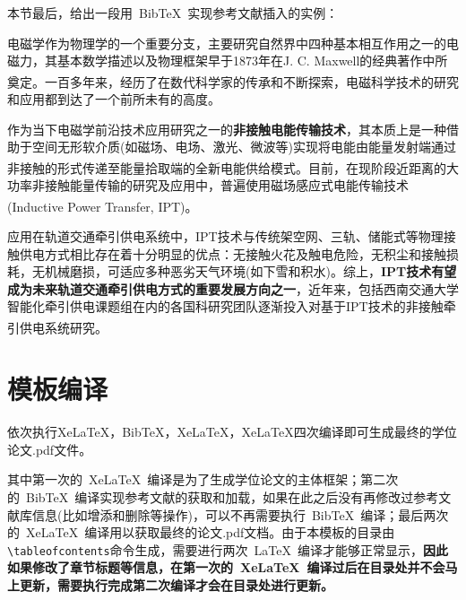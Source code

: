 \par
本节最后，给出一段用~BibTeX{}~实现参考文献插入的实例：

\begin{framed}
	电磁学作为物理学的一个重要分支，主要研究自然界中四种基本相互作用之一的电磁力，其基本数学描述以及物理框架早于1873年在J. C. Maxwell的经典著作\cite{Maxwell1873}中所奠定。一百多年来，经历了在数代科学家的传承和不断探索\textsuperscript{\cite{Stratton1941,Cheng1989,Jackson1999,Guru2004,Kong2008,Griffiths2012,Purcell2013,Ida2015}}，电磁科学技术的研究和应用都到达了一个前所未有的高度。
	
	作为当下电磁学前沿技术应用研究之一的\textbf{非接触电能传输技术}，其本质上是一种借助于空间无形软介质(如磁场、电场、激光、微波等)实现将电能由能量发射端通过非接触的形式传递至能量拾取端的全新电能供给模式\textsuperscript{\cite{黄学良2013}}。目前，在现阶段近距离的大功率非接触能量传输的研究及应用中，普遍使用磁场感应式电能传输技术(Inductive Power Transfer, IPT)\textsuperscript{\cite{covic2013inductive}}。
	
	应用在轨道交通牵引供电系统中，IPT技术与传统架空网、三轨、储能式等物理接触供电方式相比存在着十分明显的优点：无接触火花及触电危险，无积尘和接触损耗，无机械磨损，可适应多种恶劣天气环境(如下雪和积水)。综上，\textbf{IPT技术有望成为未来轨道交通牵引供电方式的重要发展方向之一}，近年来，包括西南交通大学智能化牵引供电课题组在内的各国科研究团队逐渐投入对基于IPT技术的非接触牵引供电系统研究\textsuperscript{\cite{Buja2015,Kim2015}}。
\end{framed}

\section{模板编译}
依次执行XeLaTeX，BibTeX，XeLaTeX，XeLaTeX四次编译即可生成最终的学位论文.pdf文件。

\par
其中第一次的~XeLaTeX{}~编译是为了生成学位论文的主体框架；第二次的~BibTeX{}~编译实现参考文献的获取和加载，如果在此之后没有再修改过参考文献库信息(比如增添和删除等操作)，可以不再需要执行~BibTeX{}~编译；最后两次的~XeLaTeX{}~编译用以获取最终的论文.pdf文档。由于本模板的目录由\verb|\tableofcontents|命令生成，需要进行两次~\LaTeX~编译才能够正常显示，\textbf{因此如果修改了章节标题等信息，在第一次的~XeLaTeX{}~编译过后在目录处并不会马上更新，需要执行完成第二次编译才会在目录处进行更新。}